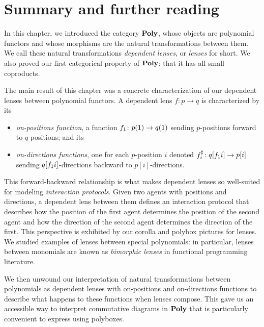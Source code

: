 \documentclass[Book-Poly]{subfiles}
\begin{document}
\section{Summary and further reading}

In this chapter, we introduced the category $\mathbf{Poly}$, whose objects are polynomial functors and whose morphisms are the natural transformations between them.
We call these natural transformations \emph{dependent lenses}, or \emph{lenses} for short.
We also proved our first categorical property of $\mathbf{Poly}$: that it has all small coproducts.

The main result of this chapter was a concrete characterization of our dependent lenses between polynomial functors.
A dependent lens $f\colon p\to q$ is characterized by its
\begin{itemize}
  \item \emph{on-positions function}, a function $f_{\textsf{1}}\colon p(\textsf{1})\to q(\textsf{1})$ sending $p$-positions forward to $q$-positions; and its
  \item \emph{on-directions functions}, one for each $p$-position $i$ denoted $f^\sharp_i\colon q[f_{\textsf{1}} i]\to p[i]$ sending $q[f_{\textsf{1}} i]$-directions backward to $p[i]$-directions.
\end{itemize}
This forward-backward relationship is what makes dependent lenses so well-suited for modeling \emph{interaction protocols}.
Given two agents with positions and directions, a dependent lens between them defines an interaction protocol that describes how the position of the first agent determines the position of the second agent and how the direction of the second agent determines the direction of the first.
This perspective is exhibited by our corolla and polybox pictures for lenses.
We studied examples of lenses between special polynomials: in particular, lenses between monomials are known as \emph{bimorphic lenses} in functional programming literature.


We then unwound our interpretation of natural transformations between polynomials as dependent lenses with on-positions and on-directions functions to describe what happens to these functions when lenses compose.
This gave us an accessible way to interpret commutative diagrams in $\mathbf{Poly}$ that is particularly convenient to express using polyboxes.
\end{document}
